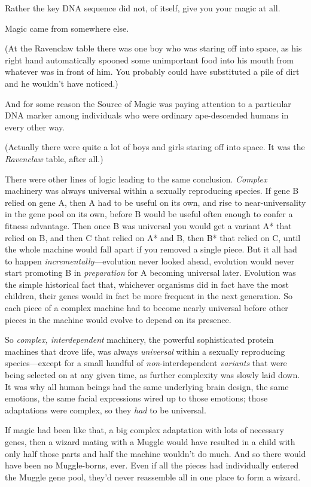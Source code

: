 Rather the key DNA sequence did not, of itself, give you your magic at all.

Magic came from somewhere else.

(At the Ravenclaw table there was one boy who was staring off into space, as his right hand automatically spooned some unimportant food into his mouth from whatever was in front of him. You probably could have substituted a pile of dirt and he wouldn’t have noticed.)

And for some reason the Source of Magic was paying attention to a particular DNA marker among individuals who were ordinary ape-descended humans in every other way.

(Actually there were quite a lot of boys and girls staring off into space. It was the \emph{Ravenclaw} table, after all.)

There were other lines of logic leading to the same conclusion. \emph{Complex} machinery was always universal within a sexually reproducing species. If gene B relied on gene A, then A had to be useful on its own, and rise to near-universality in the gene pool on its own, before B would be useful often enough to confer a fitness advantage. Then once B was universal you would get a variant A* that relied on B, and then C that relied on A* and B, then B* that relied on C, until the whole machine would fall apart if you removed a single piece. But it all had to happen \emph{incrementally}—evolution never looked ahead, evolution would never start promoting B in \emph{preparation} for A becoming universal later. Evolution was the simple historical fact that, whichever organisms did in fact have the most children, their genes would in fact be more frequent in the next generation. So each piece of a complex machine had to become nearly universal before other pieces in the machine would evolve to depend on its presence.

So \emph{complex, interdependent} machinery, the powerful sophisticated protein machines that drove life, was always \emph{universal} within a sexually reproducing species—except for a small handful of \emph{non}-interdependent \emph{variants} that were being selected on at any given time, as further complexity was slowly laid down. It was why all human beings had the same underlying brain design, the same emotions, the same facial expressions wired up to those emotions; those adaptations were complex, so they \emph{had} to be universal.

If magic had been like that, a big complex adaptation with lots of necessary genes, then a wizard mating with a Muggle would have resulted in a child with only half those parts and half the machine wouldn’t do much. And so there would have been no Muggle-borns, ever. Even if all the pieces had individually entered the Muggle gene pool, they’d never reassemble all in one place to form a wizard.

